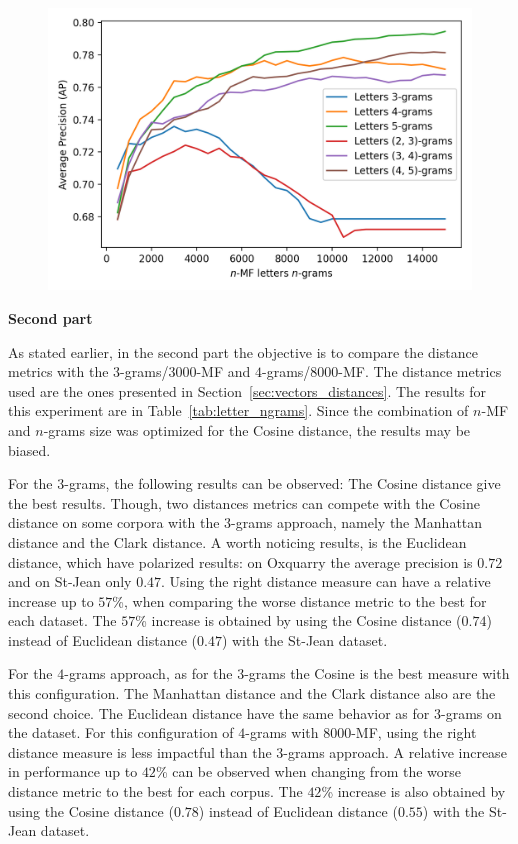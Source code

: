 \begin{figure}[!t]
  \vspace{0.5cm}

  \label{fig:letter_ngrams_st_jean}
  \includegraphics[width=\linewidth]{img/letter_ngrams_st_jean.png}
\end{figure}

\textbf{Second part}

As stated earlier, in the second part the objective is to compare the distance metrics with the $3$-grams/$3000$-MF and $4$-grams/$8000$-MF.
The distance metrics used are the ones presented in Section~\ref{sec:vectors_distances}.
The results for this experiment are in Table~\ref{tab:letter_ngrams}.
Since the combination of $n$-MF and $n$-grams size was optimized for the Cosine distance, the results may be biased.

For the $3$-grams, the following results can be observed:
The Cosine distance give the best results.
Though, two distances metrics can compete with the Cosine distance on some corpora with the $3$-grams approach, namely the Manhattan distance and the Clark distance.
A worth noticing results, is the Euclidean distance, which have polarized results: on Oxquarry the average precision is $0.72$ and on St-Jean only $0.47$.
Using the right distance measure can have a relative increase up to $57$\%, when comparing the worse distance metric to the best for each dataset.
The $57$\% increase is obtained by using the Cosine distance ($0.74$) instead of Euclidean distance ($0.47$) with the St-Jean dataset.

For the $4$-grams approach, as for the $3$-grams the Cosine is the best measure with this configuration.
The Manhattan distance and the Clark distance also are the second choice.
The Euclidean distance have the same behavior as for $3$-grams on the dataset.
For this configuration of $4$-grams with $8000$-MF, using the right distance measure is less impactful than the $3$-grams approach.
A relative increase in performance up to $42$\% can be observed when changing from the worse distance metric to the best for each corpus.
The $42$\% increase is also obtained by using the Cosine distance ($0.78$) instead of Euclidean distance ($0.55$) with the St-Jean dataset.

